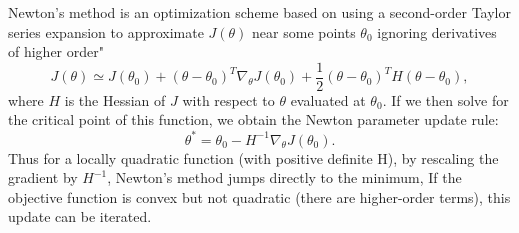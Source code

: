 \documentclass{article}
\begin{document}
	 \noindent Newton's method is an optimization scheme based on using a second-order Taylor series expansion to approximate $J(\theta)$ near some points $\theta_0$ ignoring derivatives of higher order"
	 \begin{equation}
	 J(\theta)\simeq J(\theta_0) + (\theta - \theta_0)^T\nabla_\theta J(\theta_0)+\frac{1}{2}(\theta - \theta_0)^TH(\theta - \theta_0),
	 \end{equation} 
	 where $H$ is the Hessian of $J$ with respect to $\theta$ evaluated at $\theta_0$. If we then solve for the critical point of this function, we obtain the Newton parameter update rule:
	 \begin{equation}
	 \theta^* = \theta_0 - H^{-1}\nabla_{\theta}J(\theta_0).
	 \end{equation}
	 Thus for a locally quadratic function (with positive definite H), by rescaling the gradient by $H^{-1}$, Newton's method jumps directly to the minimum, If the objective function is convex but not quadratic (there are higher-order terms), this update can be iterated.
\end{document}
